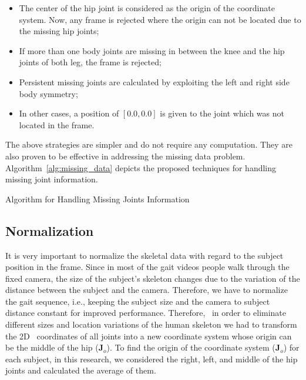 \begin{itemize}
	\item The center of the hip joint is considered as the origin of the coordinate system. Now, any frame is rejected where the origin can not be located due to the missing hip joints;
	\item If more than one body joints are missing in between the knee and the hip joints of both leg, the frame is rejected;
	\item Persistent missing joints are calculated by exploiting the left and right side body symmetry;
	\item In other cases, a position of $[0.0, 0.0]$ is given to the joint which was not located in the frame.
\end{itemize}

The above strategies are simpler and do not require any computation. They are also proven to be effective in addressing the missing data problem. Algorithm~\ref{alg:missing_data} depicts the proposed techniques for handling missing joint information.

\begin{algorithm}
	\caption{Algorithm for Handling Missing Joints Information}
	\label{alg:missing_data}
	\begin{algorithmic}
		
	\end{algorithmic}
\end{algorithm}


\subsection{Normalization}
It is very important to normalize the skeletal data with regard to the subject position in the frame. Since in most of the gait videos people walk through the fixed camera, the size of the subject's skeleton changes due to the variation of the distance between the subject and the camera. Therefore, we have to normalize the gait sequence, i.e., keeping the subject size and the camera to subject distance constant for improved performance. Therefore,  in order to eliminate different sizes and location variations of the human skeleton we had to transform the 2D  coordinates of all joints into a new coordinate system whose origin can be the middle of the hip ($\mathbf{J}_{o}$). To find the origin of the coordinate system ($\mathbf{J}_{o}$) for each subject, in this research, we considered the right, left, and middle of the hip joints and calculated the average of them. 

